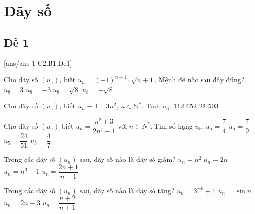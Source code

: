\section{Dãy số}

\subsection{Đề 1}
[ans/ans-1-C2.B1.De1]
\caulc

\begin{ex}%
	Cho dãy số $(u_{n})$, biết $u_{n}=(-1)^{n+1}\cdot\sqrt{n+1}$. Mệnh đề nào sau đây đúng?
	\choice
	{$u_{8}=3$}
	{\True $u_{8}=-3$}
	{$u_{8}=\sqrt{8}$}
	{$u_{8}=-\sqrt{8}$}
\end{ex}

\begin{ex}%
	Cho dãy số $(u_{n})$, biết $u_{n}=4+3n^2$, $n\in \mathbb{N}^*$. Tính $u_{6}$.
	\choice
	{\True $112$}
	{$652$}
	{$22$}
	{$503$}
\end{ex}


\begin{ex}%
	Cho dãy số $\left(u_{n}\right)$ biết $u_{n}=\dfrac{n^{2}+3}{2n^{2}-1}$ với $n\in N^{*}$. Tìm số hạng $u_{5}$.
	\choice
	{$u_{5}=\dfrac{7}{4}$}
	{$u_{5}=\dfrac{7}{9}$} 
	{$u_{5}=\dfrac{24}{51}$}
	{\True $u_{5}=\dfrac{4}{7}$}
	
\end{ex}

\begin{ex}%
	Trong các dãy số $(u_{n})$ sau, dãy số nào là dãy số giảm?
	\choice
	{$u_{n}=n^2$}
	{$u_{n}=2n$}
	{$u_{n}=n^3-1$}
	{\True $u_{n}=\dfrac{2n+1}{n-1}$}
\end{ex}

\begin{ex}%
	Trong các dãy số $(u_{n})$ sau, dãy số nào là dãy số tăng?
	\choice
	{$u_{n}=3^{-n}+1$}
	{$u_{n}=\sin n$}
	{\True $u_{n}=2n-3$}
	{$u_{n}=\dfrac{n+2}{n+1}$}
\end{ex}

